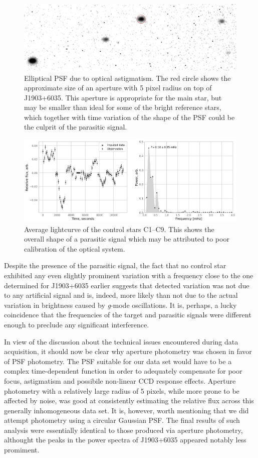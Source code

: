 \documentclass{aastex631}
\begin{document}
\begin{figure}[htbp]
\centering
\includegraphics[width=.4\linewidth]{./img/psf.png}
\caption{\label{fig:psf}Elliptical PSF due to optical astigmatism. The
  red circle shows the approximate size of an aperture with 5 pixel
  radius on top of J1903+6035. This aperture is appropriate for the
  main star, but may be smaller than ideal for some of the bright
  reference stars, which together with time variation of the shape of
  the PSF could be the culprit of the parasitic signal.}
\end{figure}

\begin{figure}[htbp]
\centering
\includegraphics[width=.9\linewidth]{./img/average.png}
\caption{\label{fig:avg}Average lightcurve of the control stars
  C1--C9. This shows the overall shape of a parasitic signal which may
  be attributed to poor calibration of the optical system.}
\end{figure}

Despite the presence of the parasitic signal, the fact that no control
star exhibited any even slightly prominent variation with a frequency
close to the one determined for J1903+6035 earlier suggests that
detected variation was not due to any artificial signal and is,
indeed, more likely than not due to the actual variation in brightness
caused by \emph{g}-mode oscillations. It is, perhaps, a lucky
coincidence that the frequencies of the target and parasitic signals
were different enough to preclude any significant interference.

In view of the discussion about the technical issues encountered
during data acquisition, it should now be clear why aperture
photometry was chosen in favor of PSF photometry. The PSF suitable for
our data set would have to be a complex time-dependent function in
order to adequately compensate for poor focus, astigmatism and
possibile non-linear CCD response effects. Aperture photometry with a
relatively large radius of 5 pixels, while more prone to be affected
by noise, was good at consistently estimating the relative flux across
this generally inhomogeneous data set. It is, however, worth
mentioning that we did attempt photometry using a circular Gaussian
PSF. The final results of such analysis were essentially identical to
those produced via aperture photometry, althought the peaks in the
power spectra of J1903+6035 appeared notably less promiment.
\end{document}
